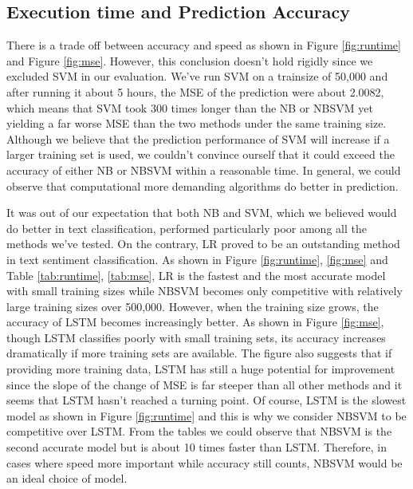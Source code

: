 \documentclass[letterpaper]{article} %
\begin{document}
\subsection{Execution time and Prediction Accuracy}
There is a trade off between accuracy and speed as shown in Figure \ref{fig:runtime} and Figure \ref{fig:mse}. However, this conclusion doesn't hold rigidly since we excluded SVM in our evaluation. We've run SVM on a trainsize of 50,000 and after running it about 5 hours, the MSE of the prediction were about 2.0082, which means that SVM took 300 times longer than the NB or NBSVM yet yielding a far worse MSE than the two methods under the same training size. Although we believe that the prediction performance of SVM will increase if a larger training set is used, we couldn't convince ourself that it could exceed the accuracy of either NB or NBSVM within a reasonable time. In general, we could observe that computational more demanding algorithms do better in prediction.

It was out of our expectation that both NB and SVM, which we believed would do better in text classification, performed particularly poor among all the methods we've tested. On the contrary, LR proved to be an outstanding method in text sentiment classification. As shown in Figure \ref{fig:runtime}, \ref{fig:mse} and Table \ref{tab:runtime}, \ref{tab:mse}, LR is the fastest and the most accurate model with small training sizes while NBSVM becomes only competitive with relatively large training sizes over 500,000. However, when the training size grows, the accuracy of LSTM becomes increasingly better. As shown in Figure \ref{fig:mse}, though LSTM classifies poorly with small training sets, its accuracy increases dramatically if more training sets are available. The figure also suggests that if providing more training data, LSTM has still a huge potential for improvement since the slope of the change of MSE is far steeper than all other methods and it seems that LSTM hasn't reached a turning point. Of course, LSTM is the slowest model as shown in Figure \ref{fig:runtime} and this is why we consider NBSVM to be competitive over LSTM. From the tables we could observe that NBSVM is the second accurate model but is about 10 times faster than LSTM. Therefore, in cases where speed more important while accuracy still counts, NBSVM would be an ideal choice of model. 
\end{document}
